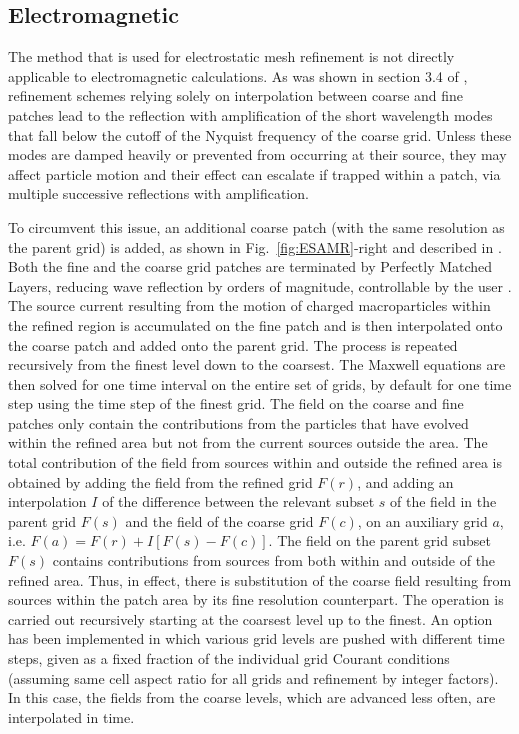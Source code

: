 \subsection{Electromagnetic}
The method that is used for electrostatic mesh refinement is not directly applicable to electromagnetic calculations. As was shown in section 3.4 of \cite{Vayjcp01}, refinement schemes relying solely on interpolation between coarse and fine patches lead to the reflection with amplification of the short wavelength modes that fall below the cutoff of the Nyquist frequency of the coarse grid. Unless these modes are damped heavily or prevented from occurring at their source, they may affect particle motion and their effect can escalate if trapped within a patch, via multiple successive reflections with amplification.

To circumvent this issue, an additional coarse patch (with the same resolution as the parent grid) is added, as shown in Fig.~\ref{fig:ESAMR}-right and described in \cite{Vaycpc04}. Both the fine and the coarse grid patches are terminated by Perfectly Matched Layers, reducing wave reflection by orders of magnitude, controllable by the user \cite{Berengerjcp96,Vayjcp02}. The source current resulting from the motion of charged macroparticles within the refined region is accumulated on the fine patch and is then interpolated onto the coarse patch and added onto the parent grid. The process is repeated recursively from the finest level down to the coarsest. The Maxwell equations are then solved for one time interval on the entire set of grids, by default for one time step using the time step of the finest grid. The field on the coarse and fine patches only contain the contributions from the particles that have evolved within the refined area but not from the current sources outside the area. The total contribution of the field from sources within and outside the refined area is obtained by adding the field from the refined grid $F(r)$, and adding an interpolation $I$ of the difference between the relevant subset $s$ of the field in the parent grid $F(s)$ and the field of the coarse grid  $F( c )$, on an auxiliary grid $a$, i.e. $F(a)=F(r)+I[F(s)-F( c )]$. The field on the parent grid subset $F(s)$ contains contributions from sources from both within and outside of the refined area. Thus, in effect, there is substitution of the coarse field resulting from sources within the patch area by its fine resolution counterpart. The operation is carried out recursively starting at the coarsest level up to the finest.
An option has been implemented in which various grid levels are pushed with different time steps, given as a fixed fraction of the individual grid Courant conditions (assuming same cell aspect ratio for all grids and refinement by integer factors). In this case, the fields from the coarse levels, which are advanced less often, are interpolated in time.

